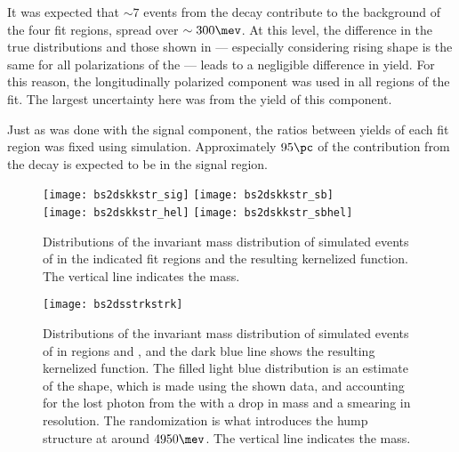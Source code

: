It was expected that $\sim7$ events from the decay \btodsstrphi contribute to the background of the
four fit regions, spread over $\sim300\mev$.
At this level, the difference in the true distributions and those shown in 
--- especially considering rising shape is the same for all polarizations of the \phii ---
leads to a negligible difference in yield.
For this reason, the longitudinally polarized \btodsstrphi component was used in all regions of the
fit.
The largest uncertainty here was from the yield of this component.

Just as was done with the signal component, the ratios between yields of each fit region was fixed
using simulation.
Approximately $95\pc$ of the contribution from the decay \btodsstrphi is expected to be in the
signal region.


\begin{figure}
  \begin{center}
    \texttt{[image: bs2dskkstr\_sig]}
    \texttt{[image: bs2dskkstr\_sb]}\\
    \texttt{[image: bs2dskkstr\_hel]}
    \texttt{[image: bs2dskkstr\_sbhel]}
    \caption[Shapes of background contributions of \bstodskstrk]
    {\small
      Distributions of the invariant mass distribution of simulated events of \bstodskstrk
      in the indicated fit regions and the resulting kernelized function.
      The vertical line indicates the \Bp mass.
    }
    \label{fig:dsphi:bstodskstrk}
  \end{center}
\end{figure}


\begin{figure}
  \begin{center}
    \texttt{[image: bs2dsstrkstrk]}
    \caption[Shapes of background contributions of \bstodsstrkstrk]
    {\small
      Distributions of the invariant mass distribution of simulated events of \bstodskstrk in
      regions \rA and \rC, and the dark blue line shows the resulting kernelized function.
      The filled light blue distribution is an estimate of the \bstodsstrkstrk shape, which is made
      using the shown data, and accounting for the lost photon from the \Dss with a drop in mass
      and a smearing in resolution.
      The randomization is what introduces the hump structure at around $4950\mev$.
      The vertical line indicates the \Bp mass.
    }
    \label{fig:dsphi:bstodsstrkstrk}
  \end{center}
\end{figure}


